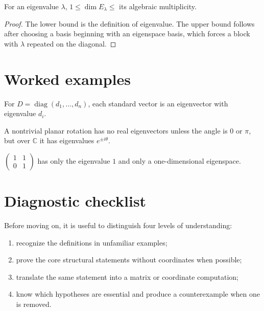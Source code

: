 \begin{theorem}\label{thm:i09-02}
For an eigenvalue $\lambda$, $1\le\dim E_\lambda\le$ its algebraic multiplicity.
\begin{proof}
The lower bound is the definition of eigenvalue. The upper bound follows after choosing a basis beginning with an eigenspace basis, which forces a block with $\lambda$ repeated on the diagonal.
\end{proof}
\end{theorem}

\section{Worked examples}

\begin{example}\label{ex:i09-worked-01}
For $D=\operatorname{diag}(d_1,\ldots,d_n)$, each standard vector is an eigenvector with eigenvalue $d_i$.
\end{example}

\begin{example}[Rotation]\label{ex:i09-worked-02}
A nontrivial planar rotation has no real eigenvectors unless the angle is $0$ or $\pi$, but over $\mathbb C$ it has eigenvalues $e^{\pm i\theta}$.
\end{example}

\begin{example}[Shear]\label{ex:i09-worked-03}
$\begin{pmatrix}1&1\\0&1\end{pmatrix}$ has only the eigenvalue $1$ and only a one-dimensional eigenspace.
\end{example}

\section{Diagnostic checklist}
Before moving on, it is useful to distinguish four levels of understanding:
\begin{enumerate}
\item recognize the definitions in unfamiliar examples;
\item prove the core structural statements without coordinates when possible;
\item translate the same statement into a matrix or coordinate computation;
\item know which hypotheses are essential and produce a counterexample when one is removed.
\end{enumerate}

